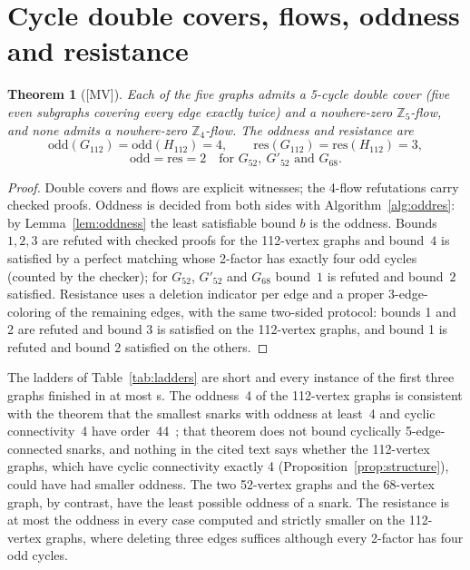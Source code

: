 \documentclass[11pt]{article}
\newtheorem{theorem}{Theorem}[section]
\theoremstyle{definition}
\theoremstyle{remark}
\newcommand{\Gmain}{G_{112}}
\newcommand{\Gsym}{H_{112}}
\newcommand{\Gfty}{G_{52}}
\newcommand{\Gftyb}{G'_{52}}
\newcommand{\Gsix}{G_{68}}
\newcommand{\Zfive}{\mathbb{Z}_5}
\newcommand{\mv}{\textup{[MV]}}
\begin{document}
\section{Cycle double covers, flows, oddness and resistance}\label{sec:cdc}

\begin{theorem}[\mv]\label{thm:cdc}
Each of the five graphs admits a 5-cycle double cover (five even subgraphs covering
every edge exactly twice) and a nowhere-zero $\Zfive$-flow, and none admits a nowhere-zero
$\mathbb{Z}_4$-flow. The oddness and resistance are
\[
\mathrm{odd}(\Gmain) = \mathrm{odd}(\Gsym) = 4,\qquad \mathrm{res}(\Gmain) = \mathrm{res}(\Gsym) = 3,
\]
\[
\mathrm{odd} = \mathrm{res} = 2 \quad\text{for } \Gfty,\ \Gftyb \text{ and } \Gsix .
\]
\end{theorem}

\begin{proof}
Double covers and flows are explicit witnesses; the 4-flow refutations carry checked proofs.
Oddness is decided from both sides with Algorithm~\ref{alg:oddres}: by Lemma~\ref{lem:oddness} the
least satisfiable bound $b$ is the oddness. Bounds $1, 2, 3$ are refuted with checked proofs for the
112-vertex graphs and bound~$4$ is satisfied by a perfect matching whose 2-factor has exactly four
odd cycles (counted by the checker); for $\Gfty$, $\Gftyb$ and $\Gsix$ bound~$1$ is refuted and
bound~$2$ satisfied. Resistance uses a deletion indicator per edge and a proper 3-edge-coloring of
the remaining edges, with the same two-sided protocol: bounds 1 and 2 are refuted and bound 3 is
satisfied on the 112-vertex graphs, and bound 1 is refuted and bound 2 satisfied on the others.
\end{proof}

\begin{table}[htbp]\centering\footnotesize\setlength{\tabcolsep}{4pt}

\caption{Oddness and resistance ladders. U: unsatisfiable with the size of the checked proof;
S: satisfiable with a verified witness. The least satisfiable bound is the value.}\label{tab:ladders}
\end{table}

The ladders of Table~\ref{tab:ladders} are short and every instance of the first three graphs
finished in at most \CdcMaxA{} s. The oddness~4 of the 112-vertex graphs
is consistent with the theorem that the smallest snarks with oddness at
least~4 and cyclic connectivity~4 have order~44~\cite{GMS2019}; that theorem does not bound
cyclically 5-edge-connected snarks, and nothing in the cited text says whether the 112-vertex
graphs, which have cyclic connectivity exactly 4 (Proposition~\ref{prop:structure}), could have had
smaller oddness. The two 52-vertex graphs and the 68-vertex graph, by contrast, have the least
possible oddness of a snark. The resistance is at most the oddness in every case computed and
strictly smaller on the 112-vertex graphs, where deleting three edges suffices although every
2-factor has four odd cycles.
\end{document}
